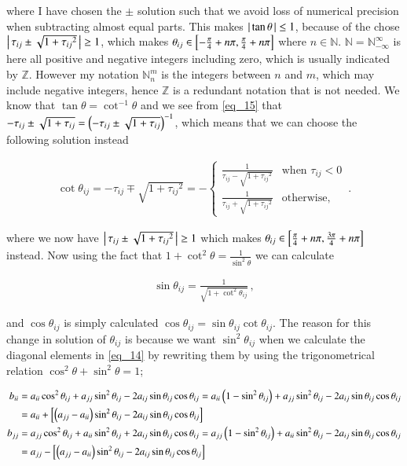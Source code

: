 \documentclass[11pt,english,a4paper]{article}
\begin{document}
\begin{flushleft}
where I have chosen the $\pm$ solution such that we avoid loss of numerical precision when subtracting almost equal parts. This makes $\left\vert{\,\tan\theta\,}\right\vert \leq 1$, because of the chose $\left\vert{\,\tau_{ij}\pm\sqrt{1+{\tau_{ij}}^2}\,}\right\vert \geq 1$, which makes $\theta_{ij} \in \left[{-\frac{\pi}{4}+n\pi,\frac{\pi}{4}+n\pi}\right]$ where $n\in\mathbb{N}$. $\mathbb{N} = \mathbb{N}_{-\infty}^{\infty}$ is here all positive and negative integers including zero, which is usually indicated by $\mathbb{Z}$. However my notation $\mathbb{N}_n^m$ is the integers between $n$ and $m$, which may include negative integers, hence $\mathbb{Z}$ is a redundant notation that is not needed. We know that $\tan\theta = \cot^{-1}\theta$ and we see from \eqref{eq_15} that $-\tau_{ij}\pm\sqrt{1+\tau_{ij}} = \left({-\tau_{ij}\pm\sqrt{1+\tau_{ij}}}\right)^{-1}$, which means that we can choose the following solution instead

\begin{align}
\cot\theta_{ij} = -\tau_{ij} \mp \sqrt{1+{\tau_{ij}}^2} = -\begin{cases} \frac{1}{\tau_{ij}-\sqrt{1+{\tau_{ij}}^2}} & \text{when } \tau_{ij}< 0 \\ \frac{1}{\tau_{ij}+\sqrt{1+{\tau_{ij}}^2}} & \text{otherwise,} \end{cases} \,.
\label{eq_16}
\end{align}

where we now have $\left\vert{\,\tau_{ij}\pm\sqrt{1+{\tau_{ij}}^2}\,}\right\vert \geq 1$ which makes $\theta_{ij} \in \left[{\frac{\pi}{4}+n\pi,\frac{3\pi}{4}+n\pi}\right]$ instead. Now using the fact that $1+\cot^2\theta = \frac{1}{\sin^2\theta}$ we can calculate

\begin{align}
\sin\theta_{ij} = \frac{1}{\sqrt{1+\cot^2\theta_{ij}}} \,,
\label{eq_17}
\end{align}

and $\cos\theta_{ij}$ is simply calculated $\cos\theta_{ij} = \sin\theta_{ij}\cot\theta_{ij}$. The reason for this change in solution of $\theta_{ij}$ is because we want $\sin^2\theta_{ij}$ when we calculate the diagonal elements in \eqref{eq_14} by rewriting them by using the trigonometrical relation $\cos^2\theta+\sin^2\theta = 1$;

\begin{align}
b_{ii} &= a_{ii}\cos^2\theta_{ij} + a_{jj}\sin^2\theta_{ij} - 2 a_{ij}\sin\theta_{ij}\cos\theta_{ij} 
= a_{ii}\left({1-\sin^2\theta_{ij}}\right) + a_{jj}\sin^2\theta_{ij} - 2 a_{ij}\sin\theta_{ij}\cos\theta_{ij}
\nonumber\\
&= a_{ii} + \left[{\left({a_{jj}-a_{ii}}\right)\sin^2\theta_{ij} - 2 a_{ij}\sin\theta_{ij}\cos\theta_{ij}}\right]
\label{eq_18}
\\
b_{jj} &= a_{jj}\cos^2\theta_{ij} + a_{ii}\sin^2\theta_{ij} + 2a_{ij}\sin\theta_{ij}\cos\theta_{ij}
= a_{jj}\left({1-\sin^2\theta_{ij}}\right) + a_{ii}\sin^2\theta_{ij} - 2a_{ij}\sin\theta_{ij}\cos\theta_{ij}
\nonumber\\
&= a_{jj} - \left[{\left({a_{jj}-a_{ii}}\right)\sin^2\theta_{ij} - 2a_{ij}\sin\theta_{ij}\cos\theta_{ij}}\right]
\label{eq_19}
\end{align}


\end{flushleft}
\end{document}
